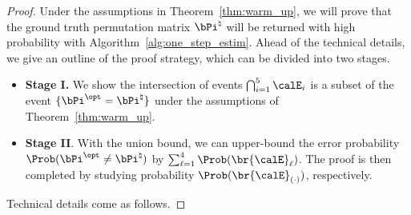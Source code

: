\documentclass[11pt]{article}
\def \bPitrue {\bPi^{\natural}}
\begin{document}
\begin{proof}
Under the assumptions in Theorem~\ref{thm:warm_up},
we will prove that the ground truth permutation matrix $\bPitrue$ will be returned
with high probability with Algorithm~\ref{alg:one_step_estim}.
Ahead of the technical details, we give an outline of the
proof strategy, which can be divided into two stages.
\begin{itemize}
\item
\textbf{Stage I.}
We show the intersection of events
$\bigcap_{i=1}^5 \calE_i$ is a subset of the
event $\{\bPi^{\opt} = \bPitrue\}$ under the assumptions
of Theorem~\ref{thm:warm_up}.

\item
\textbf{Stage II}.
With the union bound,
we can upper-bound the error probability
$\Prob(\bPi^{\opt }\neq \bPitrue)$
by $\sum_{\ell =1}^4 \Prob(\br{\calE}_{\ell})$.
The proof is then completed by studying
probability $\Prob(\br{\calE}_{(\cdot)})$, respectively.
\end{itemize}
Technical details come as follows.


\end{proof}
\end{document}
